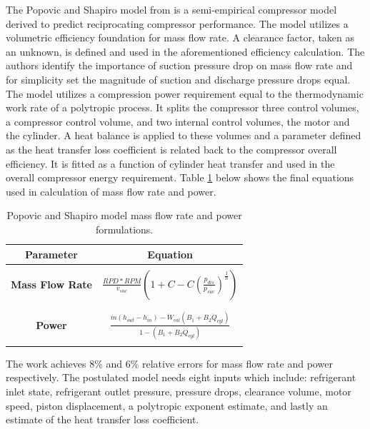 \documentclass[preprint,11pt,authoryear]{elsarticle}
\begin{document}
The Popovic and Shapiro model from \cite{Popovic1995a} is a semi-empirical compressor model derived to predict reciprocating compressor performance. The model utilizes a volumetric efficiency foundation for mass flow rate. A clearance factor, taken as an unknown, is defined and used in the aforementioned efficiency calculation. The authors identify the importance of suction pressure drop on mass flow rate and for simplicity set the magnitude of suction and discharge pressure drops equal. The model utilizes a compression power requirement equal to the thermodynamic work rate of a polytropic process. It splits the compressor three control volumes, a compressor control volume, and two internal control volumes, the motor and the cylinder. A heat balance is applied to these volumes and a parameter defined as the heat transfer loss coefficient is related back to the compressor overall efficiency. It is fitted as a function of cylinder heat transfer and used in the overall compressor energy requirement. Table \ref{Tab:pop_eqs} below shows the final equations used in calculation of mass flow rate and power.

\begin{table}[h]
\caption{Popovic and Shapiro model mass flow rate and power formulations.}
\label{Tab:pop_eqs}
\begin{center}
\begin{tabular}{c c}
\hline
\hline
\textbf{Parameter} & Equation \\
\hline
\hline 
\\[-2ex] %
\textbf{Mass Flow Rate} & \(\displaystyle \frac{RPD*RPM}{v_{suc}}(1 + C - C(\frac{p_{dis}}{p_{suc}})^{\frac{1}{n}})\) \\
\\[-2ex] %
\hline %
\\[-2ex] %
\textbf{Power} & \(\displaystyle \frac{\dot{m}(h_{out}-h_{in})- \dot{W}_{cal}(B_1+B_2\dot{Q}_{cyl})}{1 - (B_1+B_2\dot{Q}_{cyl})} \)
\\
\\[-2ex] %
\hline
\hline
\end{tabular}
\end{center}
\end{table}

The work achieves 8\% and 6\% relative errors for mass flow rate and power respectively. The postulated model needs eight inputs which include: refrigerant inlet state, refrigerant outlet pressure, pressure drops, clearance volume, motor speed, piston displacement, 
a polytropic exponent estimate, and lastly an estimate of the heat transfer loss coefficient.
\end{document}
